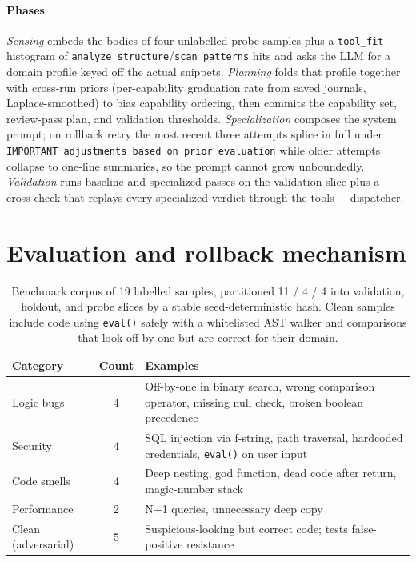 \documentclass[11pt,a4paper]{article}
\begin{document}
\paragraph{Phases} \emph{Sensing} embeds the bodies of four unlabelled probe samples plus a \texttt{tool\_fit} histogram of \texttt{analyze\_structure}/\texttt{scan\_patterns} hits and asks the LLM for a domain profile keyed off the actual snippets. \emph{Planning} folds that profile together with cross-run priors (per-capability graduation rate from saved journals, Laplace-smoothed) to bias capability ordering, then commits the capability set, review-pass plan, and validation thresholds. \emph{Specialization} composes the system prompt; on rollback retry the most recent three attempts splice in full under \texttt{IMPORTANT adjustments based on prior evaluation} while older attempts collapse to one-line summaries, so the prompt cannot grow unboundedly. \emph{Validation} runs baseline and specialized passes on the validation slice plus a cross-check that replays every specialized verdict through the tools + dispatcher.

\section{Evaluation and rollback mechanism}\label{sec:eval}

\begin{table}[!htbp]
\small
\begin{tabularx}{\linewidth}{@{}lcX@{}}
\toprule
\textbf{Category} & \textbf{Count} & \textbf{Examples} \\
\midrule
Logic bugs & 4 & Off-by-one in binary search, wrong comparison operator, missing null check, broken boolean precedence \\
Security & 4 & SQL injection via f-string, path traversal, hardcoded credentials, \texttt{eval()} on user input \\
Code smells & 4 & Deep nesting, god function, dead code after return, magic-number stack \\
Performance & 2 & N+1 queries, unnecessary deep copy \\
Clean (adversarial) & 5 & Suspicious-looking but correct code; tests false-positive resistance \\
\bottomrule
\end{tabularx}
\captionsetup{skip=1pt}
\caption{Benchmark corpus of 19 labelled samples, partitioned 11 / 4 / 4 into validation, holdout, and probe slices by a stable seed-deterministic hash. Clean samples include code using \texttt{eval()} safely with a whitelisted AST walker and comparisons that look off-by-one but are correct for their domain.}
\end{table}
\end{document}
